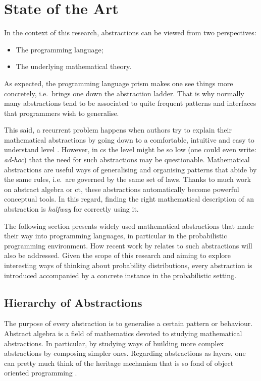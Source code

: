 \documentclass[
  oneside,
  11pt, a4paper,
  footinclude=true,
  headinclude=true,
  cleardoublepage=empty
]{scrbook}
\theoremstyle{definition}
\theoremstyle{definition}
\begin{document}
	\section{State of the Art}\label{sec-state-art}
	
	In the context of this research, abstractions can be viewed from two perspectives:
	\begin{itemize}
	   \item The programming language;
	   \item The underlying mathematical theory.
	\end{itemize}{}
	    
	As expected, the programming language prism makes one see things more concretely, i.e.\ brings one down the abstraction ladder. That is why normally many abstractions tend to be associated to quite frequent patterns and interfaces that programmers wish to generalise.
	    
	This said, a recurrent problem happens when authors try to explain their mathematical abstractions by going down to a comfortable, intuitive and easy to understand level \citep{DBLP:journals/corr/abs-1803-10195}. However, in \gls{cs} the level might be so low (one could even write: \emph{ad-hoc}) that the need for such abstractions may be questionable. Mathematical abstractions are useful ways of generalising and organising patterns that abide by the same rules, i.e.\ are governed by the same set of laws. Thanks to much work on abstract algebra or \gls{ct}, these abstractions automatically become powerful conceptual tools. In this regard, finding the right mathematical description of an abstraction is \emph{halfway} for correctly using it.
	    
	The following section presents widely used mathematical abstractions that made their way into programming languages, in particular in the probabilistic programming environment. How recent work by \cite{andrey2019selective} relates to such abstractions will also be addressed. Given the scope of this research and aiming to explore interesting ways of thinking about probability distributions, every abstraction is introduced accompanied by a concrete instance in the probabilistic setting.
	    
	    \subsection{Hierarchy of Abstractions}
	    
	The purpose of every abstraction is to generalise a certain pattern or behaviour. Abstract algebra is a field of mathematics devoted to studying mathematical abstractions. In particular, by studying ways of building more complex abstractions by composing simpler ones. Regarding abstractions as layers, one can pretty much think of the heritage mechanism that is so fond of object oriented programming \citep{Liskov:1987:KAD:62139.62141}.
	    
\end{document}
